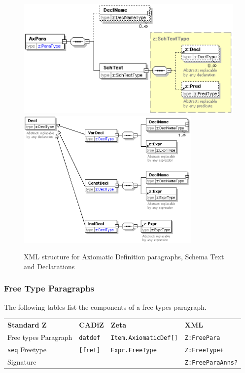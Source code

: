 \documentclass{llncs}  %
\newcommand{\AFont}[1]{\texttt{#1}}
\newcommand{\CADiZ}{CADiZ}
\newcommand{\Zeta}{Zeta}
\newcommand{\AParagraph}{Paragraph}
\newcommand{\ASignature}{Signature}
\newcommand{\CFreetype}{Freetype}
\begin{document}
\begin{figure}[htbp]
  \centering
  \includegraphics[width=\textwidth]{axpara.eps}
  \includegraphics[width=0.8\textwidth]{decls.eps}
  \caption{XML structure for Axiomatic Definition paragraphs, Schema Text
  and Declarations}
  \label{fig:axpara}
\end{figure}



\subsubsection{Free Type Paragraphs}

The following tables list the components of a free types paragraph.

\begin{center}
\begin{tabular}{|l|l|l|l|}
\hline
{\bf Standard Z} & {\bf \CADiZ} & {\bf \Zeta} & {\bf XML}\\
Free types \AParagraph & \AFont{datdef} & \AFont{Item.AxiomaticDef[]} & \AFont{Z:FreePara}\\
\hline
\AFont{seq} \CFreetype & \AFont{[fret]} & \AFont{Expr.FreeType} & \AFont{Z:FreeType+}\\
\ASignature & & & \AFont{Z:FreeParaAnns?}\\
\hline
\end{tabular}
\end{center}
\end{document}
